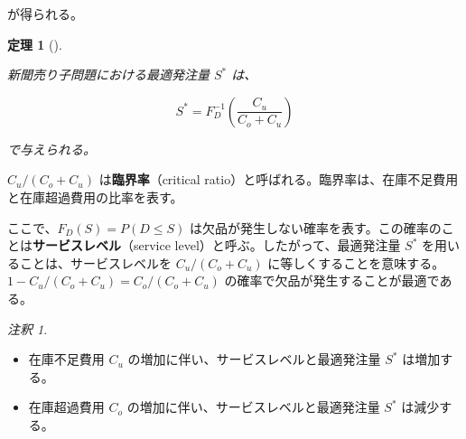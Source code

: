 \documentclass[
  japanese,
  letterpaper,
]{ltjbook}
\providecommand{\tightlist}{%
  \setlength{\itemsep}{0pt}\setlength{\parskip}{0pt}}
\theoremstyle{plain}
\newtheorem{theorem}{定理}[chapter]
\theoremstyle{definition}
\theoremstyle{remark}
\newtheorem{refremark}{注釈}[chapter]
\begin{document}
が得られる。

\begin{theorem}[]\protect\hypertarget{thm-newsvendor}{}\label{thm-newsvendor}

新聞売り子問題における最適発注量 \(S^*\) は、

\[
S^* = F_D^{-1}\left(\frac{C_u}{C_o + C_u}\right)
\]

で与えられる。

\end{theorem}

\(C_u/(C_o + C_u)\) は\textbf{臨界率}（critical
ratio）と呼ばれる。臨界率は、在庫不足費用と在庫超過費用の比率を表す。

ここで、\(F_D(S) = P(D \leq S)\)
は欠品が発生しない確率を表す。この確率のことは\textbf{サービスレベル}（service
level）と呼ぶ。したがって、最適発注量 \(S^*\)
を用いることは、サービスレベルを \(C_u/(C_o + C_u)\)
に等しくすることを意味する。\(1 - C_u/(C_o + C_u) = C_o/(C_o + C_u)\)
の確率で欠品が発生することが最適である。

\begin{refremark}
\leavevmode

\begin{itemize}
\tightlist
\item
  在庫不足費用 \(C_u\) の増加に伴い、サービスレベルと最適発注量 \(S^*\)
  は増加する。
\item
  在庫超過費用 \(C_o\) の増加に伴い、サービスレベルと最適発注量 \(S^*\)
  は減少する。
\end{itemize}

\label{rem-newsvendor}

\end{refremark}
\end{document}
